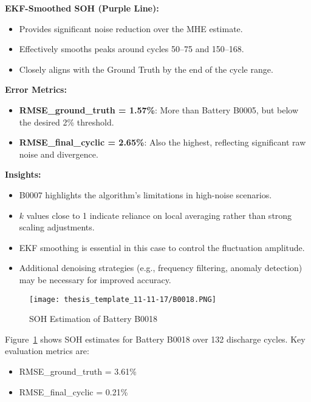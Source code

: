 \vspace{0.5em}
\textbf{EKF-Smoothed SOH (Purple Line):}
\begin{itemize}
    \item Provides significant noise reduction over the MHE estimate.
    \item Effectively smooths peaks around cycles 50--75 and 150--168.
    \item Closely aligns with the Ground Truth by the end of the cycle range.
\end{itemize}

\vspace{0.5em}
\textbf{Error Metrics:}
\begin{itemize}
    \item \textbf{RMSE\_ground\_truth = 1.57\%}: More than Battery B0005, but below the desired 2\% threshold.
    \item \textbf{RMSE\_final\_cyclic = 2.65\%}: Also the highest, reflecting significant raw noise and divergence.
\end{itemize}

\vspace{0.5em}
\textbf{Insights:}
\begin{itemize}
    \item B0007 highlights the algorithm’s limitations in high-noise scenarios.
    \item $k$ values close to 1 indicate reliance on local averaging rather than strong scaling adjustments.
    \item EKF smoothing is essential in this case to control the fluctuation amplitude.
    \item Additional denoising strategies (e.g., frequency filtering, anomaly detection) may be necessary for improved accuracy.
\end{itemize}

\begin{figure}
    \centering
    \texttt{[image: thesis\_template\_11-11-17/B0018.PNG]}
    \caption{SOH Estimation of Battery B0018}
    \label{fig:resB0018}
\end{figure}

Figure~\ref{fig:resB0018} shows SOH estimates for Battery B0018 over 132 discharge cycles. Key evaluation metrics are:
\begin{itemize}
    \item RMSE\_ground\_truth = 3.61\%
    \item RMSE\_final\_cyclic = 0.21\%
\end{itemize}

